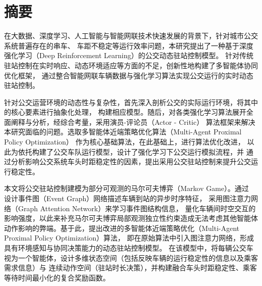 \chapter*{摘\quad 要}
\cabstractpagestyle %

在大数据、深度学习、人工智能与智能网联技术快速发展的背景下，针对城市公交系统普遍存在的串车、
车距不稳定等运行效率问题，本研究提出了一种基于深度强化学习（Deep Reinforcement Learning）的公交动态驻站控制模型。
针对传统驻站控制在实时响应、动态环境适应等方面的不足，创新性地构建了多智能体协同优化框架，
通过整合智能网联车辆数据与强化学习算法实现公交运行的实时动态驻站控制。

针对公交运营环境的动态性与复杂性，首先深入剖析公交的实际运行环境，将其中的核心要素进行抽象化处理，
构建相应模型。随后，对各类强化学习算法展开全面阐释与分析，经综合考量，采用演员-评论员（Actor - Critic）
算法框架来解决本研究面临的问题。选取多智能体近端策略优化算法（Multi-Agent Proximal Policy Optimization）
作为核心基础算法，在此基础上，进行算法优化改进，
以此为依托构建了公交车队运行模型，设计了强化学习下公交运行模拟流程，并
通过分析影响公交系统车头时距稳定性的因素，提出采用公交驻站控制来提升公交运行稳定性。

本文将公交驻站控制建模为部分可观测的马尔可夫博弈（Markov Game）。通过
设计事件图（Event Graph）网络描述车辆到站的异步时序特征，
采用图注意力网络（Graph Attention Network）来学习事件图结构信息，
量化车辆间时空交互的影响强度，以此来补充马尔可夫博弈局部观测独立性约束造成无法考虑其他智能体
动作影响的弊端。基于此，提出改进的多智能体近端策略优化（Multi-Agent Proximal Policy Optimization）算法，
即在原始算法中引入图注意力网络，形成具有环境感知与协同决策能力的动态驻站控制模型。
在该模型中，将每辆公交车视为一个智能体，设计多维状态空间（包括反映车辆的运行稳定性的信息以及乘客需求信息）与
连续动作空间（驻站时长决策），并构建融合车头时距稳定性、乘客等待时间最小化的复合奖励函数。

